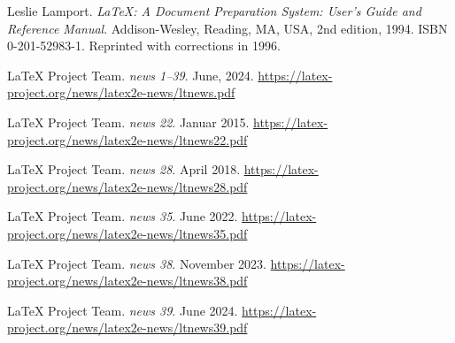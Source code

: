 \documentclass{ltnews}
\begin{document}
\begin{thebibliography}{9}\frenchspacing


Leslie Lamport.
\newblock \emph{{\LaTeX}: {A} Document Preparation System: User's Guide and Reference
  Manual}.
\newblock \mbox{Addison}-Wesley, Reading, MA, USA, 2nd edition, 1994.
\newblock ISBN 0-201-52983-1.
\newblock Reprinted with corrections in 1996.

 \LaTeX{} Project Team.
  \emph{\LaTeXe{} news 1--39}. June, 2024.
  \url{https://latex-project.org/news/latex2e-news/ltnews.pdf}

 \LaTeX{} Project Team.
  \emph{\LaTeXe{} news 22}. Januar 2015.
  \url{https://latex-project.org/news/latex2e-news/ltnews22.pdf}

 \LaTeX{} Project Team.
  \emph{\LaTeXe{} news 28}. April 2018.
  \url{https://latex-project.org/news/latex2e-news/ltnews28.pdf}

 \LaTeX{} Project Team.
  \emph{\LaTeXe{} news 35}. June 2022.
  \url{https://latex-project.org/news/latex2e-news/ltnews35.pdf}

 \LaTeX{} Project Team.
  \emph{\LaTeXe{} news 38}. November 2023.
  \url{https://latex-project.org/news/latex2e-news/ltnews38.pdf}

 \LaTeX{} Project Team.
  \emph{\LaTeXe{} news 39}. June 2024.
  \url{https://latex-project.org/news/latex2e-news/ltnews39.pdf}

\end{thebibliography}
\end{document}
